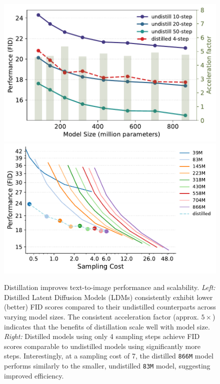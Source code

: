 \begin{figure}[!t]
    \centering
    \def\xwidth{.31\linewidth}
    \includegraphics[height=\xwidth]{cp2/figures/analyze_distill_perfomrance.pdf}
    \includegraphics[height=\xwidth]{cp2/figures/analyze_distill_inference_costs.pdf}
    \caption{Distillation improves text-to-image performance and scalability. \emph{Left:} Distilled Latent Diffusion Models (LDMs) consistently exhibit lower (better) FID scores compared to their undistilled counterparts across varying model sizes. The consistent acceleration factor (approx. $5\times$) indicates that the benefits of distillation scale well with model size.
    \emph{Right:} Distilled models using only 4 sampling steps achieve FID scores comparable to undistilled models using significantly more steps. Interestingly, at a sampling cost of 7, the distilled \texttt{866M} model performs similarly to the smaller, undistilled \texttt{83M} model, suggesting improved efficiency. 
    }
    \label{fig:distll}
\end{figure}


